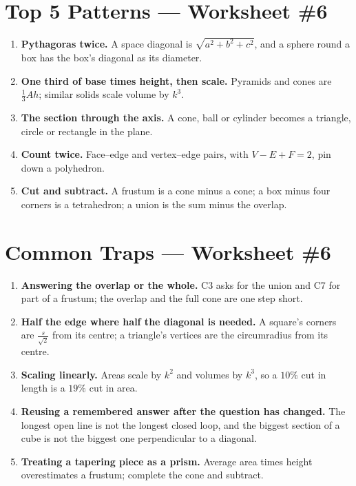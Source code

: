 \documentclass[11pt,a4paper]{article}
\begin{document}
\section*{Top 5 Patterns --- Worksheet \#6}
\begin{enumerate}[leftmargin=2em, itemsep=4pt]
  \item \textbf{Pythagoras twice.} A space diagonal is $\sqrt{a^2+b^2+c^2}$, and a sphere round a box has the box's diagonal as its diameter. 
  \item \textbf{One third of base times height, then scale.} Pyramids and cones are $\tfrac13Ah$; similar solids scale volume by $k^3$. 
  \item \textbf{The section through the axis.} A cone, ball or cylinder becomes a triangle, circle or rectangle in the plane. 
  \item \textbf{Count twice.} Face--edge and vertex--edge pairs, with $V-E+F=2$, pin down a polyhedron. 
  \item \textbf{Cut and subtract.} A frustum is a cone minus a cone; a box minus four corners is a tetrahedron; a union is the sum minus the overlap. 
\end{enumerate}

\section*{Common Traps --- Worksheet \#6}
\begin{enumerate}[leftmargin=2em, itemsep=4pt]
  \item \textbf{Answering the overlap or the whole.} C3 asks for the union and C7 for part of a frustum; the overlap and the full cone are one step short. 
  \item \textbf{Half the edge where half the diagonal is needed.} A square's corners are $\tfrac{s}{\sqrt2}$ from its centre; a triangle's vertices are the circumradius from its centre. 
  \item \textbf{Scaling linearly.} Areas scale by $k^2$ and volumes by $k^3$, so a $10\%$ cut in length is a $19\%$ cut in area. 
  \item \textbf{Reusing a remembered answer after the question has changed.} The longest open line is not the longest closed loop, and the biggest section of a cube is not the biggest one perpendicular to a diagonal. 
  \item \textbf{Treating a tapering piece as a prism.} Average area times height overestimates a frustum; complete the cone and subtract. 
\end{enumerate}

\end{document}
